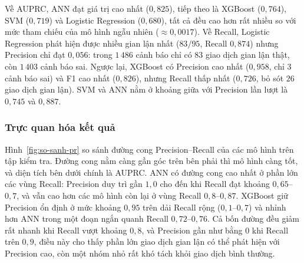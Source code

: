\begin{table}[H]
\centering
{}
\caption{Kết quả trên tập kiểm tra ($\tau = 0{,}5$). Giá trị in đậm là tốt nhất theo từng cột.}
\label{tab:ket-qua-test}
\end{table}

Về AUPRC, ANN đạt giá trị cao nhất ($0{,}825$), tiếp theo là XGBoost ($0{,}764$), SVM ($0{,}719$) và Logistic Regression ($0{,}680$), tất cả đều cao hơn rất nhiều so với mức tham chiếu của mô hình ngẫu nhiên ($\approx 0{,}0017$). Về Recall, Logistic Regression phát hiện được nhiều gian lận nhất ($83/95$, Recall $0{,}874$) nhưng Precision chỉ đạt $0{,}056$: trong $1\,486$ cảnh báo chỉ có $83$ giao dịch gian lận thật, còn $1\,403$ cảnh báo sai. Ngược lại, XGBoost có Precision cao nhất ($0{,}958$, chỉ $3$ cảnh báo sai) và F1 cao nhất ($0{,}826$), nhưng Recall thấp nhất ($0{,}726$, bỏ sót $26$ giao dịch gian lận). SVM và ANN nằm ở khoảng giữa với Precision lần lượt là $0{,}745$ và $0{,}887$.

\subsubsection{Trực quan hóa kết quả}
Hình~\ref{fig:so-sanh-pr} so sánh đường cong Precision--Recall của các mô hình trên tập kiểm tra. Đường cong nằm càng gần góc trên bên phải thì mô hình càng tốt, và diện tích bên dưới chính là AUPRC. ANN có đường cong cao nhất ở phần lớn các vùng Recall: Precision duy trì gần $1{,}0$ cho đến khi Recall đạt khoảng $0{,}65$--$0{,}7$, và vẫn cao hơn các mô hình còn lại ở vùng Recall $0{,}8$--$0{,}87$. XGBoost giữ Precision ổn định ở mức khoảng $0{,}95$ trên dải Recall rộng ($0{,}1$--$0{,}7$) và nhỉnh hơn ANN trong một đoạn ngắn quanh Recall $0{,}72$--$0{,}76$. Cả bốn đường đều giảm rất nhanh khi Recall vượt khoảng $0{,}8$, và Precision gần như bằng $0$ khi Recall trên $0{,}9$, điều này cho thấy phần lớn giao dịch gian lận có thể phát hiện với Precision cao, còn một nhóm nhỏ rất khó tách khỏi giao dịch bình thường.

